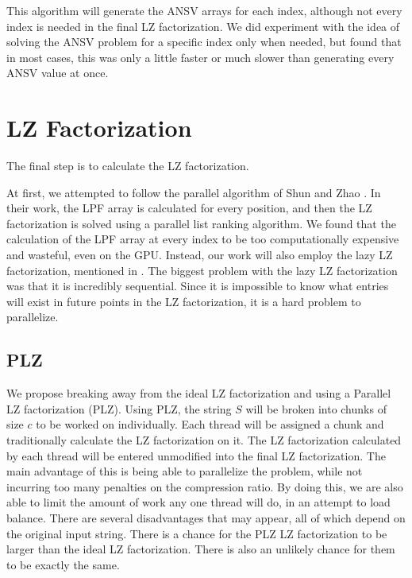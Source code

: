 This algorithm will generate the ANSV arrays for each index, although not every index is needed in the final LZ factorization. 
We did experiment with the idea of solving the ANSV problem for a specific index only when needed, but found that in most cases, this was only a little faster or much slower than generating every ANSV value at once.

\section{LZ Factorization}

The final step is to calculate the LZ factorization.

At first, we attempted to follow the parallel algorithm of Shun and Zhao \cite{shun2013practical}.
In their work, the LPF array is calculated for every position, and then the LZ factorization is solved using a parallel list ranking algorithm.
We found that the calculation of the LPF array at every index to be too computationally expensive and wasteful, even on the GPU.
Instead, our work will also employ the lazy LZ factorization, mentioned in \cite{karkkainen2013linear}.
The biggest problem with the lazy LZ factorization was that it is incredibly sequential.
Since it is impossible to know what entries will exist in future points in the LZ factorization, it is a hard problem to parallelize.

\subsection{PLZ}

We propose breaking away from the ideal LZ factorization and using a Parallel LZ factorization (PLZ).
Using PLZ, the string $S$ will be broken into chunks of size $c$ to be worked on individually.
Each thread will be assigned a chunk and traditionally calculate the LZ factorization on it.
The LZ factorization calculated by each thread will be entered unmodified into the final LZ factorization.
The main advantage of this is being able to parallelize the problem, while not incurring too many penalties on the compression ratio.
By doing this, we are also able to limit the amount of work any one thread will do, in an attempt to load balance.
There are several disadvantages that may appear, all of which depend on the original input string.
There is a chance for the PLZ LZ factorization to be larger than the ideal LZ factorization.
There is also an unlikely chance for them to be exactly the same.


